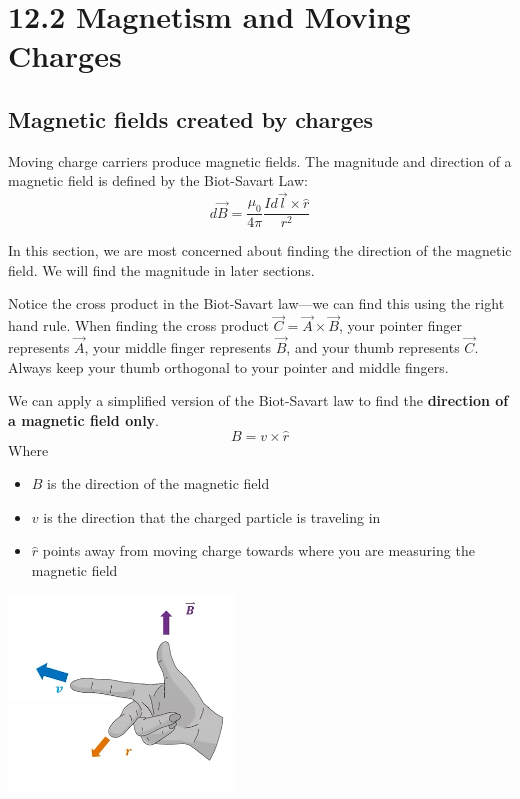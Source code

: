 \documentclass[12pt, titlepage]{article}
\begin{document}
\section*{12.2 Magnetism and Moving Charges}
\subsection*{Magnetic fields created by charges}

Moving charge carriers produce magnetic fields. The magnitude and direction of a magnetic field is defined by the Biot-Savart Law:
\begin{equation*}
    d\vec{B} = \frac{\mu_0}{4\pi}\frac{Id\vec{l}\times\hat{r}}{r^2}
\end{equation*}

In this section, we are most concerned about finding the direction of the magnetic field. We will find the magnitude in later sections.

Notice the cross product in the Biot-Savart law---we can find this using the right hand rule. When finding the cross product $\vec{C}=\vec{A}\times\vec{B}$, your pointer finger represents $\vec{A}$, your middle finger represents $\vec{B}$, and your thumb represents $\vec{C}$. Always keep your thumb orthogonal to your pointer and middle fingers.

We can apply a simplified version of the Biot-Savart law to find the \textbf{direction of a magnetic field only}.
\begin{equation*}
    B=v\times\hat{r}
\end{equation*}
Where
\begin{itemize}
    \item \textbf{$B$} is the direction of the magnetic field
    \item \textbf{$v$} is the direction that the charged particle is traveling in 
    \item \textbf{$\hat{r}$} points away from moving charge towards where you are measuring the magnetic field
\end{itemize}

\begin{center}
    \includegraphics[width=6cm]{media/rh1.png}
\end{center}
\end{document}
